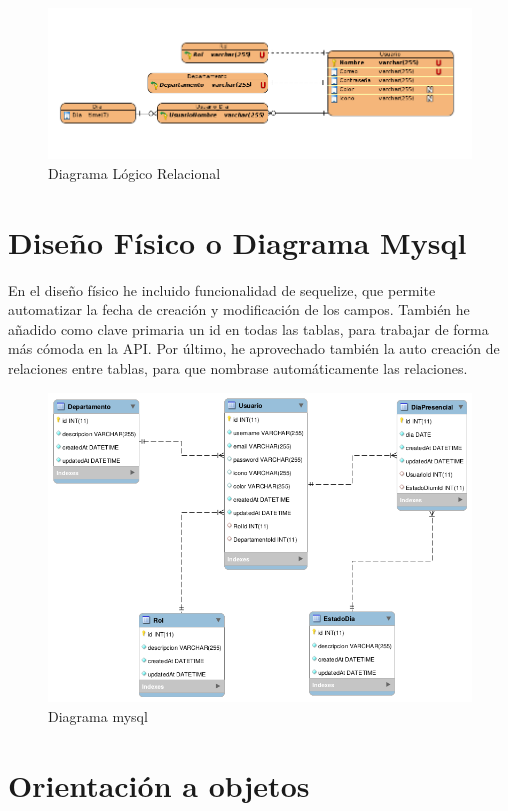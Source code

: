 \documentclass[11pt,spanish,listoffigures,listoftables]{tfgetsinf}
\begin{document}
\begin{figure}[h!] %
  \includegraphics[width=\linewidth]{img/pasotablas.png}
  \caption{Diagrama Lógico Relacional}
  \label{fig:diagramalr}
\end{figure}

\section{Diseño Físico o Diagrama Mysql}
En el diseño físico he incluido funcionalidad de sequelize, que permite automatizar la fecha de creación y modificación de los campos.
También he añadido como clave primaria un id en todas las tablas, para trabajar de forma más cómoda en la API.
Por último, he aprovechado también la auto creación de relaciones entre tablas, para que nombrase automáticamente las relaciones.
\begin{figure}[h!] %
   \includegraphics[scale=0.40]{img/EsquemaBBDD.png}
   \caption{Diagrama mysql}
   \label{fig:diagramaMysql}
 \end{figure}

\section{Orientación a objetos}
\end{document}
